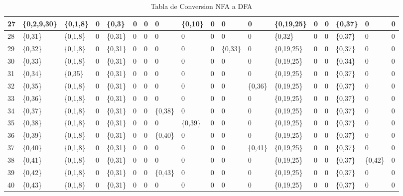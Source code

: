 \documentclass{article}
\begin{document}
\begin{table}[!htbp]
\begin{adjustbox}{max width=\textwidth}
\begin{tabular}{|l|l|l|l|l|l|l|l|l|l|l|l|l|l|l|l|l|l|}
                27 & \{0,2,9,30\} & \{0,1,8\} & 0 & \{0,3\} & 0 & 0 & 0 & \{0,10\} & 0 & 0 & 0 & \{0,19,25\} & 0 & 0 & \{0,37\} & 0 & 0 \\ \hline
                28 & \{0,31\} & \{0,1,8\} & 0 & \{0,31\} & 0 & 0 & 0 & 0 & 0 & 0 & 0 & \{0,32\} & 0 & 0 & \{0,37\} & 0 & 0 \\ \hline
                29 & \{0,32\} & \{0,1,8\} & 0 & \{0,31\} & 0 & 0 & 0 & 0 & 0 & \{0,33\} & 0 & \{0,19,25\} & 0 & 0 & \{0,37\} & 0 & 0 \\ \hline
                30 & \{0,33\} & \{0,1,8\} & 0 & \{0,31\} & 0 & 0 & 0 & 0 & 0 & 0 & 0 & \{0,19,25\} & 0 & 0 & \{0,34\} & 0 & 0 \\ \hline
                31 & \{0,34\} & \{0,35\} & 0 & \{0,31\} & 0 & 0 & 0 & 0 & 0 & 0 & 0 & \{0,19,25\} & 0 & 0 & \{0,37\} & 0 & 0 \\ \hline
                32 & \{0,35\} & \{0,1,8\} & 0 & \{0,31\} & 0 & 0 & 0 & 0 & 0 & 0 & \{0,36\} & \{0,19,25\} & 0 & 0 & \{0,37\} & 0 & 0 \\ \hline
                33 & \{0,36\} & \{0,1,8\} & 0 & \{0,31\} & 0 & 0 & 0 & 0 & 0 & 0 & 0 & \{0,19,25\} & 0 & 0 & \{0,37\} & 0 & 0 \\ \hline
                34 & \{0,37\} & \{0,1,8\} & 0 & \{0,31\} & 0 & 0 & \{0,38\} & 0 & 0 & 0 & 0 & \{0,19,25\} & 0 & 0 & \{0,37\} & 0 & 0 \\ \hline
                35 & \{0,38\} & \{0,1,8\} & 0 & \{0,31\} & 0 & 0 & 0 & \{0,39\} & 0 & 0 & 0 & \{0,19,25\} & 0 & 0 & \{0,37\} & 0 & 0 \\ \hline
                36 & \{0,39\} & \{0,1,8\} & 0 & \{0,31\} & 0 & 0 & \{0,40\} & 0 & 0 & 0 & 0 & \{0,19,25\} & 0 & 0 & \{0,37\} & 0 & 0 \\ \hline
                37 & \{0,40\} & \{0,1,8\} & 0 & \{0,31\} & 0 & 0 & 0 & 0 & 0 & 0 & \{0,41\} & \{0,19,25\} & 0 & 0 & \{0,37\} & 0 & 0 \\ \hline
                38 & \{0,41\} & \{0,1,8\} & 0 & \{0,31\} & 0 & 0 & 0 & 0 & 0 & 0 & 0 & \{0,19,25\} & 0 & 0 & \{0,37\} & \{0,42\} & 0 \\ \hline
                39 & \{0,42\} & \{0,1,8\} & 0 & \{0,31\} & 0 & 0 & \{0,43\} & 0 & 0 & 0 & 0 & \{0,19,25\} & 0 & 0 & \{0,37\} & 0 & 0 \\ \hline
                40 & \{0,43\} & \{0,1,8\} & 0 & \{0,31\} & 0 & 0 & 0 & 0 & 0 & 0 & 0 & \{0,19,25\} & 0 & 0 & \{0,37\} & 0 & 0 \\ \hline
            \end{tabular}
            \end{adjustbox}
            \caption{Tabla de Conversion NFA a DFA}
        \end{table}
        \newpage
\end{document}

